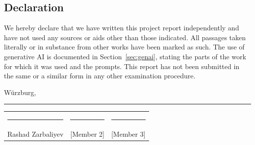 \subsection*{Declaration}

We hereby declare that we have written this project report independently and have not used any sources or aids other than those indicated. All passages taken literally or in substance from other works have been marked as such. The use of generative AI is documented in Section~\ref{sec:genai}, stating the parts of the work for which it was used and the prompts. This report has not been submitted in the same or a similar form in any other examination procedure.

\vspace{1.5cm}

W\"urzburg, \rule{4cm}{0.4pt}

\vspace{1.5cm}

\begin{tabular}{p{4.5cm}p{4.5cm}p{4.5cm}}
\rule{4.2cm}{0.4pt} & \rule{4.2cm}{0.4pt} & \rule{4.2cm}{0.4pt} \\
Rashad Zarbaliyev & [Member 2] & [Member 3] \\
\end{tabular}
